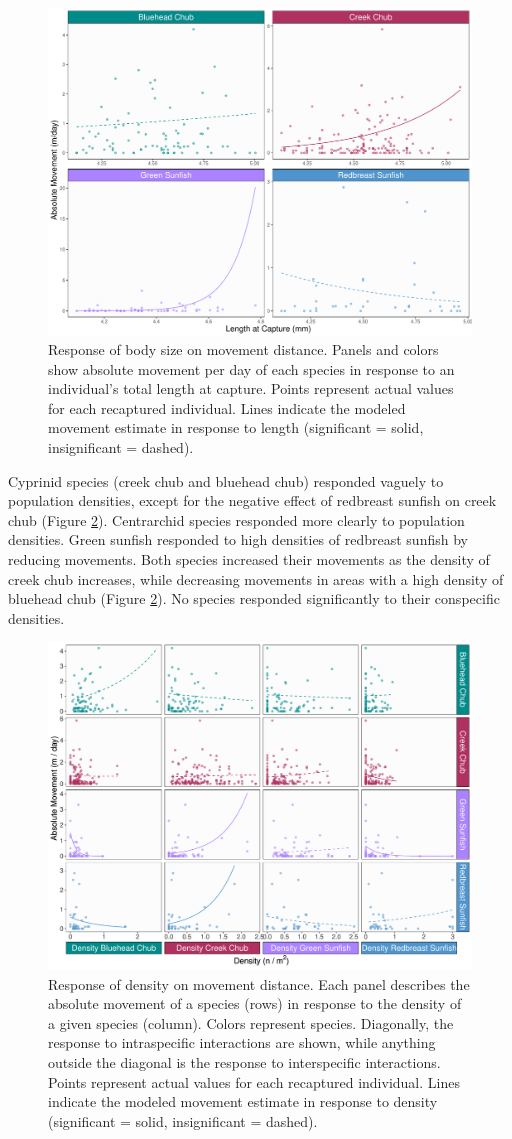 \documentclass[11pt, class=article, crop=false]{standalone}
\begin{document}
\begin{figure}
    \centering
    \includegraphics[width=0.75\linewidth]{output/fig_size.pdf}
    \caption{Response of body size on movement distance. Panels and colors show absolute movement per day of each species in response to an individual's total length at capture. Points represent actual values for each recaptured individual. Lines indicate the modeled movement estimate in response to length (significant = solid, insignificant = dashed).}
    \label{fig:fig_size}
\end{figure}
Cyprinid species (creek chub and bluehead chub) responded vaguely to population densities, except for the negative effect of redbreast sunfish on creek chub (Figure \ref{fig:fig_density}). Centrarchid species responded more clearly to population densities. Green sunfish responded to high densities of redbreast sunfish by reducing movements. Both species increased their movements as the density of creek chub increases, while decreasing movements in areas with a high density of bluehead chub (Figure \ref{fig:fig_density}). No species responded significantly to their conspecific densities.
\begin{figure}
    \centering
    \includegraphics[width=0.75\linewidth]{output/fig_density.pdf}
    \caption{Response of density on movement distance. Each panel describes the absolute movement of a species (rows) in response to the density of a given species (column). Colors represent species. Diagonally, the response to intraspecific interactions are shown, while anything outside the diagonal is the response to interspecific interactions. Points represent actual values for each recaptured individual. Lines indicate the modeled movement estimate in response to density (significant = solid, insignificant = dashed).}
    \label{fig:fig_density}
\end{figure}
\end{document}
